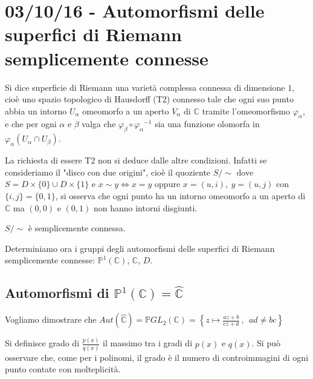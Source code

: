 \chapter{03/10/16 - Automorfismi delle superfici di Riemann semplicemente connesse}
\justify

\begin{definizione}
Si dice superficie di Riemann una varietà complessa connessa di dimensione $1$, cioè uno spazio topologico di Hausdorff (T2)
connesso tale che ogni suo punto abbia un intorno $U_\alpha$ omeomorfo a un aperto $V_\alpha$ di $\mathbb{C}$
tramite l'omeomorfismo $\varphi_\alpha$, e che per ogni $\alpha$ e $\beta$ valga che $\varphi_\beta \circ {\varphi_\alpha}^{-1}$
sia una funzione olomorfa in $\varphi_\alpha \left( U_\alpha \cap U_\beta \right)$.
\end{definizione}

\begin{osservazione}
La richiesta di essere T2 non si deduce dalle altre condizioni. Infatti se consideriamo il "disco con due origini",
cioè il quoziente $S/\!\!\sim$ dove $S=D\times\{0\} \cup D\times\{1\}$ e $x\sim y \Longleftrightarrow x=y$ oppure $x=(u,i),\ y=(u,j)$ con $\{i,j\}=\{0,1\}$,
si osserva che ogni punto ha un intorno omeomorfo a un aperto di $\mathbb{C}$ ma $(0,0)$ e $(0,1)$ non hanno intorni disgiunti.
\end{osservazione}

\begin{esercizio}
$S/\!\!\sim$ è semplicemente connessa.
\end{esercizio}

Determiniamo ora i gruppi degli automorfismi delle superfici di Riemann semplicemente
connesse: $\mathbb{P}^1(\mathbb{C})$, $\mathbb{C}$, $D$.


\section{Automorfismi di $\mathbb{P}^1(\mathbb{C})=\hat{\mathbb{C}}$}
Vogliamo dimostrare che $Aut( \hat{\mathbb{C}} )= \mathbb{P}GL_2 (\mathbb{C} )=\left\{z\mapsto \displaystyle{\frac{az+b}{cz+d}} \ ,\ \  ad\neq bc\right\}$

\begin{definizione}
Si definisce grado di $\frac{p(x)}{q(x)}$ il massimo tra i gradi di $p(x)$ e $q(x)$.
Si può osservare che, come per i polinomi, il grado è il numero di controimmagini di ogni punto contate con molteplicità.
\end{definizione}

